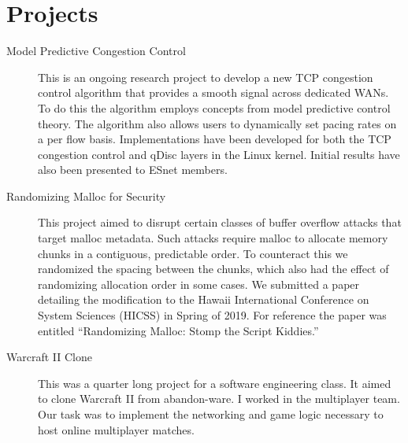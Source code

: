 \documentclass{article}
\begin{document}
\section*{Projects}

\begin{description}
    \item[Model Predictive Congestion Control]
        This is an ongoing research project to develop a new TCP congestion
        control algorithm that provides a smooth signal across dedicated WANs.
        To do this the algorithm employs concepts from model predictive control
        theory.
        The algorithm also allows users to dynamically set pacing rates on a per
        flow basis.
        Implementations have been developed for both the TCP congestion control
        and qDisc layers in the Linux kernel.
        Initial results have also been presented to ESnet members.

    \item[Randomizing Malloc for Security]
        This project aimed to disrupt certain classes of buffer overflow attacks
        that target malloc metadata.
        Such attacks require malloc to allocate memory chunks in a contiguous,
        predictable order.
        To counteract this we randomized the spacing between the chunks, which
        also had the effect of randomizing allocation order in some cases.
        We submitted a paper detailing the modification to the Hawaii
        International Conference on System Sciences (HICSS) in Spring of 2019.
        For reference the paper was entitled ``Randomizing Malloc: Stomp the
        Script Kiddies.''

    \item[Warcraft II Clone]
        This was a quarter long project for a software engineering class.
        It aimed to clone Warcraft II from abandon-ware.
        I worked in the multiplayer team.
        Our task was to implement the networking and game logic necessary to
        host online multiplayer matches.


\end{description}
\end{document}
